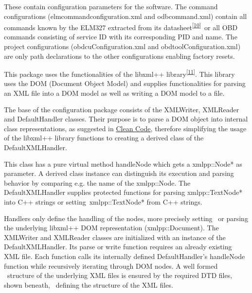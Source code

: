 {These contain configuration parameters for the software. The command
configurations (elmcommandconfiguration.xml and odbcommand.xml) contain
all commands known by the ELM327 extracted from its
datasheet}\textsuperscript{\protect\hyperlink{ftnt10}{{[}10{]}}}{~or all
OBD commands consisting of service ID with its corresponding PID and
name. The project configurations (obdcuConfiguration.xml and
obdtoolConfiguration.xml) are only path declarations to the other
configurations enabling factory resets.}

{This package uses the functionalities of the libxml++
library}\textsuperscript{\protect\hyperlink{ftnt11}{{[}11{]}}}{. This
library uses the DOM (Document Object Model) and supplies
functionalities for parsing an XML file into a DOM model as well as
writing a DOM model to a file. }

{The base of the configuration package consists of the XMLWriter,
XMLReader and DefaultHandler classes. Their purpose is to parse a DOM
object into internal class representations, as suggested in
}{\protect\hyperlink{h.mifm7q3zf07v}{Clean Code}}{, therefore
simplifying the usage of the libxml++ library functions to creating a
derived class of the DefaultXMLHandler. }

{This class has a pure virtual method handleNode which gets a
xmlpp::Node* as parameter. A derived class instance can distinguish its
execution and parsing behavior by comparing e.g. the name of the
xmlpp::Node. The DefaultXMLHandler supplies protected functions for
parsing xmlpp::TextNode* into C++ strings or
}{setting}{~xmlpp::TextNode* from C++ strings. }

{Handlers only define the handling of the nodes, more precisely setting
~or parsing the underlying libxml++ DOM representation
(xmlpp::Document). The XMLWriter and XMLReader classes are initialized
with an instance of the DefaultXMLHandler. Its parse or write function
requires an already existing XML file. Each function calls its
internally defined DefaultHandler's handleNode function while
recursively iterating through DOM nodes. A well formed ~structure of the
underlying XML files is ensured by the required DTD files, shown
beneath, ~defining the structure of the XML files.}

{}

\href{}{}\href{}{}


